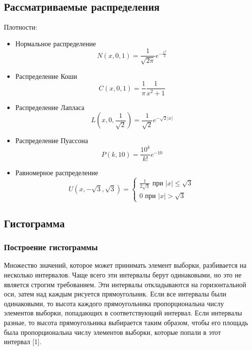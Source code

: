 \subsection {Рассматриваемые распределения}
	Плотности:
	\begin {itemize}
		\item {Нормальное распределение\\ \begin{equation}N(x, 0, 1) = \frac{1}{\sqrt{2\pi}}e^{-\frac{x^2}{2}}\end{equation}}
		\item {Распределение Коши\\ \begin{equation}C(x, 0, 1) = \frac{1}{\pi}\frac{1}{x^2+1}\end{equation}}
		\item {Распределение Лапласа\\ \begin{equation}L(x, 0, \frac{1}{\sqrt{2}}) = \frac{1}{\sqrt{2}}e^{-\sqrt{2}|x|}\end{equation}}
		\item {Распределение Пуассона\\ \begin{equation}P(k, 10) = \frac{10^k}{k!}e^{-10}\end{equation}}
		\item {Равномерное распределение\\ \begin{equation}U(x, -\sqrt{3}, \sqrt{3}) = 
										\begin{cases}
											\frac{1}{2\sqrt{3}} \text{ при } |x| \leq \sqrt{3} \\
											0  \text{ при } |x| > \sqrt{3}
										\end{cases}\end{equation}}
	\end {itemize}

\subsection {Гистограмма}
	\subsubsection {Построение гистограммы}
		Множество значений, которое может принимать элемент выборки, разбивается на несколько интервалов. Чаще всего эти интервалы берут одинаковыми, но это не является строгим требованием. Эти интервалы откладываются на горизонтальной оси, затем над каждым рисуется прямоугольник. Если все интервалы были одинаковыми, то высота каждого прямоугольника пропорциональна числу элементов выборки, попадающих в соответствующий интервал. Если интервалы разные, то высота прямоугольника выбирается таким образом, чтобы его площадь была пропорциональна числу элементов выборки, которые попали в этот интервал [1].
	
